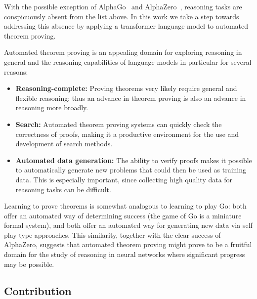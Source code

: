 \documentclass{article}
\begin{document}
With the possible exception of AlphaGo~\cite{silver2016mastering} and AlphaZero~\cite{silver2017mastering}, reasoning tasks are conspicuously absent from the list above. In this work we take a step towards addressing this absence by applying a transformer language model to automated theorem proving.

Automated theorem proving \cite{harrison2014history} is an appealing domain for exploring reasoning in general and the reasoning capabilities of language models in particular for several reasons:

\begin{itemize}
    \item {\bf Reasoning-complete:} Proving theorems very likely require general and flexible reasoning;  thus an advance in theorem proving is also an advance in reasoning more broadly.
    \item {\bf Search:} Automated theorem proving systems can quickly check the correctness of proofs, making it a productive environment for the use and development of search methods. 
    \item {\bf Automated data generation:} The ability to verify proofs makes it possible to automatically generate new problems that could then be used as training data. This is especially important, since collecting high quality data for reasoning tasks can be difficult.
\end{itemize}

Learning to prove theorems is somewhat analogous to learning to play Go:  both offer an automated way of determining success (the game of Go is a miniature formal system), and both offer an automated way for generating new data via self play-type approaches.  This similarity, together with the clear success of AlphaZero, suggests that automated theorem proving might prove to be a fruitful domain for the study of reasoning in neural networks where significant progress may be possible.

\iffalse
Access to a verifier enables (i) the verification of the predictions made by our models, thus preventing false positives; (ii) the investigation of efficient search strategies against the verifier (in our case, tree-search); (iii) training a value function based on the verifier's feedback to guide tree search. We train our models and evaluate them using the Metamath~\cite{megill2019metamath} library and formalism.
\fi

\newpage
\subsection{Contribution}
\end{document}
